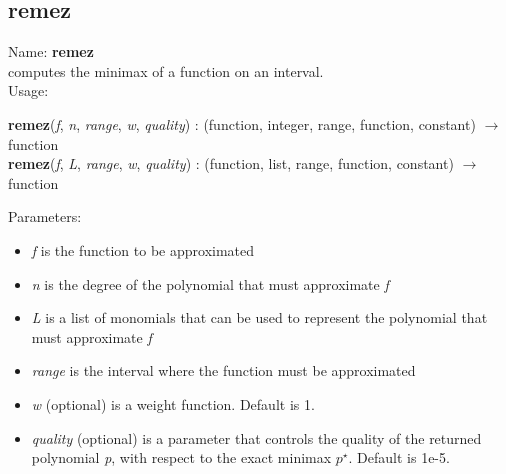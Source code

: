 \subsection{remez}
\label{labremez}
\noindent Name: \textbf{remez}\\
computes the minimax of a function on an interval.\\

\noindent Usage: 
\begin{center}
\textbf{remez}(\emph{f}, \emph{n}, \emph{range}, \emph{w}, \emph{quality}) : (\textsf{function}, \textsf{integer}, \textsf{range}, \textsf{function}, \textsf{constant}) $\rightarrow$ \textsf{function}\\
\textbf{remez}(\emph{f}, \emph{L}, \emph{range}, \emph{w}, \emph{quality}) : (\textsf{function}, \textsf{list}, \textsf{range}, \textsf{function}, \textsf{constant}) $\rightarrow$ \textsf{function}\\
\end{center}
Parameters: 
\begin{itemize}
\item \emph{f} is the function to be approximated
\item \emph{n} is the degree of the polynomial that must approximate \emph{f}
\item \emph{L} is a list of monomials that can be used to represent the polynomial that must approximate \emph{f}
\item \emph{range} is the interval where the function must be approximated
\item \emph{w} (optional) is a weight function. Default is 1.
\item \emph{quality} (optional) is a parameter that controls the quality of the returned polynomial \emph{p}, with respect to the exact minimax $p^\star$. Default is 1e-5.
\end{itemize}
